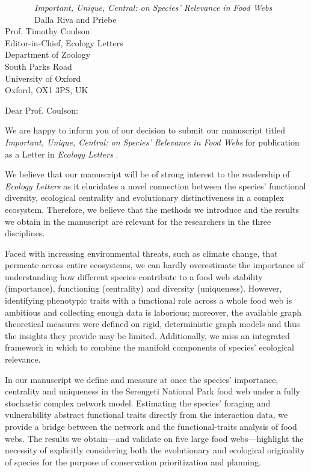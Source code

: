 \documentclass[12pt]{letter}
\newcommand{\mytitle}{\emph{Important, Unique, Central: on Species' Relevance in Food Webs }}
\newcommand{\myjournal}{\emph{Ecology Letters }}
\begin{document}
\newenvironment{refquote}{\bigskip \begin{it}}{\end{it}\smallskip}

\begin{letter}{
~~~~~~~\mytitle\\
~~~~~~~Dalla Riva and Priebe \\
       \vspace*{20pt}
       Prof. Timothy Coulson\\
       Editor-in-Chief, Ecology Letters\\
       Department of Zoology\\
       South Parks Road\\
       University of Oxford\\
       Oxford, OX1 3PS, UK}

\opening{Dear Prof. Coulson:}

We are happy to inform you of our decision to submit our manuscript titled
\mytitle for publication as a Letter in \myjournal.

We believe that our manuscript will be of strong interest to the readership of
\myjournal as it elucidates a novel connection between the species' functional
diversity, ecological centrality and evolutionary distinctiveness in a complex
ecosystem. Therefore, we believe that the methods we introduce and the results
we obtain in the manuscript are relevant for the researchers in the three disciplines.

Faced with increasing environmental threats, such as climate change, that
permeate across entire ecosystems, we can hardly overestimate the importance of
understanding how different species contribute to a food web stability
(importance), functioning (centrality) and diversity (uniqueness). However,
identifying phenotypic traits with a functional role across a whole food web is
ambitious and collecting enough data is laborious; moreover, the available
graph theoretical measures were defined on rigid, deterministic graph models
and thus the insights they provide may be limited. Additionally, we miss an
integrated framework in which to combine the manifold components of species'
ecological relevance.

In our manuscript we define and measure at once the species' importance,
centrality and uniqueness in the Serengeti National Park food web under a fully
stochastic complex network model. Estimating the species' foraging and
vulnerability abstract functional traits directly from the interaction data, we
provide a bridge between the network and the functional-traits analysis of food
webs.  The results we obtain---and validate on five large food webs---highlight
the necessity of explicitly considering both the evolutionary and ecological
originality of species for the purpose of conservation prioritization and
planning.


\end{letter}
\end{document}
